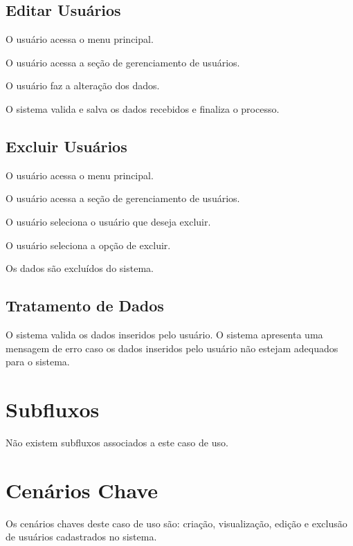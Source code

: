 \documentclass[12pt,letterpaper]{article}
\begin{document}
\subsection{Editar Usuários}

\begin{fluxo}
  \item O usuário acessa o menu principal.
  \item O usuário acessa a seção de gerenciamento de usuários.
  \item O usuário faz a alteração dos dados.
  \item O sistema valida e salva os dados recebidos e finaliza o processo.
\end{fluxo}

\subsection{Excluir Usuários}

\begin{fluxo}
  \item O usuário acessa o menu principal.
  \item O usuário acessa a seção de gerenciamento de usuários.
  \item O usuário seleciona o usuário que deseja excluir.
  \item O usuário seleciona a opção de excluir.
  \item Os dados são excluídos do sistema.
\end{fluxo}

\subsection{Tratamento de Dados}

O sistema valida os dados inseridos pelo usuário. O sistema apresenta uma
mensagem de erro caso os dados inseridos pelo usuário não estejam adequados
para o sistema.

\section{Subfluxos}

Não existem subfluxos associados a este caso de uso.

\section{Cenários Chave}

Os cenários chaves deste caso de uso são: criação, visualização, edição e
exclusão de usuários cadastrados no sistema.
\end{document}
